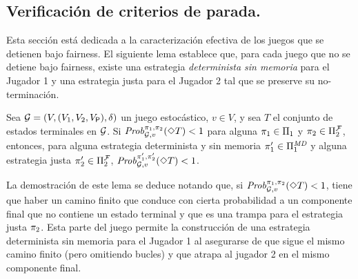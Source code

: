 \subsection{Verificación de criterios de parada.}

Esta sección está dedicada a la
caracterización efectiva de los juegos que se detienen bajo fairness.
El
siguiente lema establece que, para cada juego que no se detiene bajo
fairness, existe una estrategia \emph{determinista sin memoria} para el
Jugador 1 y una estrategia justa para el Jugador 2 tal que se preserve su no-terminación.


\begin{lemma}\label{lemma:memoryless-strat}
  Sea $\mathcal{G} = (V, (V_1, V_2, V_{\mathsf{P}}), \delta)$ un juego estocástico, $v \in V$, y sea $T$ el conjunto de estados terminales en $\mathcal{G}$.
  Si $\mathit{Prob}^{\pi_{1}, \pi_{2}}_{\mathcal{G}, v}(\Diamond T) < 1$
  para alguna
  $\pi_{1} \in \Pi_{1}$ y $\pi_{2} \in \Pi^{\mathcal{F}}_{2}$,
  entonces, para alguna estrategia determinista y sin memoria
  $\pi_{1}' \in \Pi^{\textit{MD}}_{1}$ y alguna estrategia justa
  $\pi_{2}' \in \Pi^{\mathcal{F}}_{2}$,
  $\mathit{Prob}^{\pi_{1}', \pi_{2}'}_{\mathcal{G}, v}(\Diamond T) < 1$.
\end{lemma}

La demostración de este lema se deduce notando que, si
$\mathit{Prob}^{\pi_{1}, \pi_{2}}_{\mathcal{G}, v}(\Diamond T) < 1$, tiene que haber
un camino finito que conduce con cierta probabilidad a un componente final
que no contiene un estado terminal y que es una trampa para el
estrategia justa $\pi_{2}$. Esta parte del juego permite la
construcción de una estrategia determinista sin memoria para el Jugador 1 al
asegurarse de que sigue el mismo camino finito (pero omitiendo bucles) y
que atrapa al jugador 2 en el mismo componente final.

